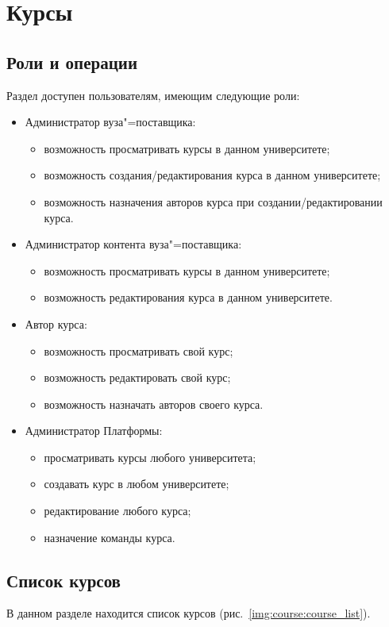 \section{Курсы}
\subsection{Роли и операции}

Раздел доступен пользователям, имеющим следующие роли:

\begin{itemize}
	\item Администратор вуза"=поставщика:
	\begin{itemize}
		\item возможность просматривать курсы в данном университете;
		\item возможность создания/редактирования курса в данном университете;
		\item возможность назначения авторов курса при создании/редактировании курса.
	\end{itemize}
	\item Администратор контента вуза"=поставщика:
	\begin{itemize}
		\item возможность просматривать курсы в данном университете;
		\item возможность редактирования курса в данном университете.
	\end{itemize}
	\item Автор курса:
	\begin{itemize}
		\item возможность просматривать свой курс;
		\item возможность редактировать свой курс;
		\item возможность назначать авторов своего курса.
	\end{itemize}
	\item Администратор Платформы:
	\begin{itemize}
		\item просматривать курсы любого университета;
		\item создавать курс в любом университете;
		\item редактирование любого курса;
		\item назначение команды курса.
	\end{itemize}
\end{itemize}
\subsection{Список курсов}
\label{course:subsec:course_list}
В данном разделе находится список курсов (рис.~\ref{img:course:course_list}).

